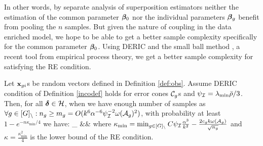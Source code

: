 
In other words, by separate analysis of superposition estimators neither the estimation of the common parameter $\boldsymbol{\beta}_0$ nor the individual parameters $\boldsymbol{\beta}_g$ benefit from pooling the $n$ samples.
But given the nature of coupling in the data enriched model, we hope to be able to get a better sample complexity specifically for the common parameter $\boldsymbol{\beta}_0$. Using DERIC and the small ball method \cite{mend15}, a recent tool from empirical process theory, we get a better sample complexity for satisfying the RE condition.
\begin{theorem}
	\label{theo:re}
	Let $\mathbf{x}_{gi}$s	be random vectors defined in Definition \ref{def:obs}.
	Assume DERIC condition of Definition \ref{incodef} holds for error cones ${\cal C}_g$s and $\psi_{{\cal{I}}}=\lambda_{\min}\bar{\rho}/3$.
	Then, for all $\boldsymbol{\delta} \in {\cal H}$, when we have enough number of samples as $\forall g \in [G]_{\setminus}: n_g \geq m_g = O(k^6 \alpha^{-6} \psi_{{\cal{I}}}^{-2} \omega({\cal A}_g)^2)$, with probability at least $1 - e^{-n \kappa_{\min}/4}$  we have:
	\be
	\nr
	\inf_{\ddelta \in \cH}   &\geq& 
	\ee
	where $\kappa_{\min} = \min_{g\in [G]_\setminus} C \psi_{{\cal{I}}} \frac{\alpha^3}{k^2}  - \frac{2 c_g k \omega({\cal A}_g)}{\sqrt{n_g}}$ and $\kappa = \frac{\kappa_{\min}^2}{4}$ is the lower bound of the RE condition.
\end{theorem}



